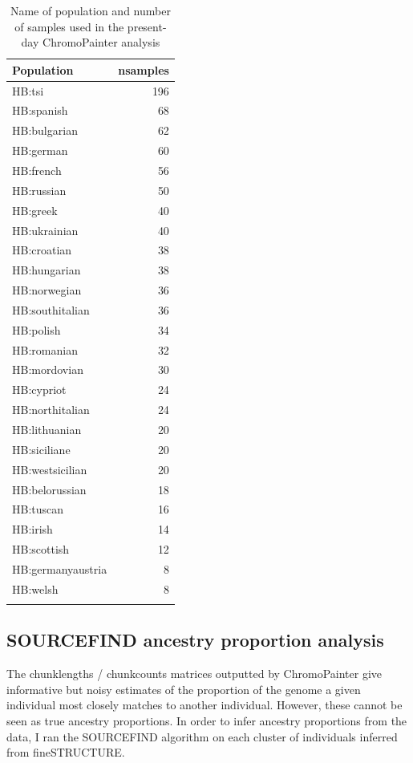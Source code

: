 \begin{table}
\small
\begin{tabular}{l|r}
\hline
Population & nsamples\\
\hline
HB:tsi & 196\\
\hline
HB:spanish & 68\\
\hline
HB:bulgarian & 62\\
\hline
HB:german & 60\\
\hline
HB:french & 56\\
\hline
HB:russian & 50\\
\hline
HB:greek & 40\\
\hline
HB:ukrainian & 40\\
\hline
HB:croatian & 38\\
\hline
HB:hungarian & 38\\
\hline
HB:norwegian & 36\\
\hline
HB:southitalian & 36\\
\hline
HB:polish & 34\\
\hline
HB:romanian & 32\\
\hline
HB:mordovian & 30\\
\hline
HB:cypriot & 24\\
\hline
HB:northitalian & 24\\
\hline
HB:lithuanian & 20\\
\hline
HB:siciliane & 20\\
\hline
HB:westsicilian & 20\\
\hline
HB:belorussian & 18\\
\hline
HB:tuscan & 16\\
\hline
HB:irish & 14\\
\hline
HB:scottish & 12\\
\hline
HB:germanyaustria & 8\\
\hline
HB:welsh & 8\\
\hline
\label{table:present-day_inds_painting}
\end{tabular}
\caption{Name of population and number of samples used in the present-day ChromoPainter analysis}
\end{table}

\subsection{SOURCEFIND ancestry proportion analysis}

The chunklengths / chunkcounts matrices outputted by ChromoPainter give informative but noisy estimates of the proportion of the genome a given individual most closely matches to another individual. However, these cannot be seen as true ancestry proportions. In order to infer ancestry proportions from the data, I ran the SOURCEFIND algorithm \cite{Chacon-Duque2018} on each cluster of individuals inferred from fineSTRUCTURE.

